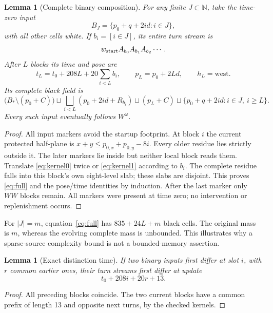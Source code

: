 \documentclass[11pt]{article}
\newtheorem{lemma}[theorem]{Lemma}
\theoremstyle{definition}\newtheorem{definition}[theorem]{Definition}
\theoremstyle{remark}\newtheorem{remark}[theorem]{Remark}
\newcommand{\N}{\mathbb N}
\begin{document}
\begin{lemma}[Complete binary composition]\label{lem:binary}
For any finite $J\subset\N$, take the time-zero input
\begin{equation}\label{eq:seed}
 B_J=\{p_0+q+2 i d:i\in J\},
\end{equation}
with all other cells white. If $b_i=[i\in J]$, its entire turn stream is
\begin{equation}\label{eq:stream}
 w_{\rm start} A_{b_0} A_{b_1} A_{b_2}\cdots.
\end{equation}
After $L$ blocks its time and pose are
\[
 t_L=t_0+208L+20\sum_{i<L}b_i,\qquad
 p_L=p_0+2Ld,\qquad h_L=\text{west}.
\]
Its complete black field is
\begin{equation}\label{eq:full}
 \bigl(B_*\setminus(p_0+C)\bigr)
 \sqcup\bigsqcup_{i<L}(p_0+2 id+R_{b_i})
 \sqcup(p_L+C)
 \sqcup\{p_0+q+2 id:i\in J,\ i\ge L\}.
\end{equation}
Every such input eventually follows $W^\omega$.
\end{lemma}
\begin{proof}
All input markers avoid the startup footprint. At block $i$ the current
protected half-plane is $x+y\le p_{0,x}+p_{0,y}-8 i$. Every older residue lies
strictly outside it. The later markers lie inside but neither local block
reads them. Translate \eqref{eq:kernel0} twice or \eqref{eq:kernel1} according
to $b_i$. The complete residue falls into this block's own eight-level slab;
these slabs are disjoint. This proves \eqref{eq:full} and the pose/time
identities by induction. After the last marker only $WW$ blocks remain.
All markers were present at time zero; no intervention or replenishment occurs.
\end{proof}
For $|J|=m$, equation~\eqref{eq:full} has $835+24L+m$ black cells. The original
mass is $m$, whereas the evolving complete mass is unbounded. This illustrates
why a sparse-source complexity bound is not a bounded-memory assertion.

\begin{lemma}[Exact distinction time]\label{lem:distinction}
If two binary inputs first differ at slot $i$, with $r$ common earlier ones,
their turn streams first differ at update
\[
 t_0+208 i+20 r+13.
\]
\end{lemma}
\begin{proof}
All preceding blocks coincide. The two current blocks have a common prefix
of length 13 and opposite next turns, by the checked kernels.
\end{proof}
\end{document}
